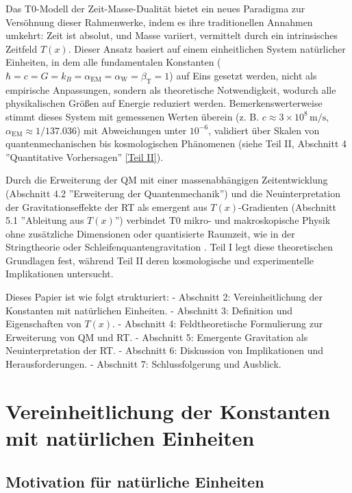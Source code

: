 \documentclass[12pt,a4paper]{article}
\newcommand{\Tfield}{T(x)}
\newcommand{\alphaEM}{\alpha_{\text{EM}}}
\newcommand{\alphaW}{\alpha_{\text{W}}}
\newcommand{\betaT}{\beta_{\text{T}}}
\begin{document}
	Das T0-Modell der Zeit-Masse-Dualität bietet ein neues Paradigma zur Versöhnung dieser Rahmenwerke, indem es ihre traditionellen Annahmen umkehrt: Zeit ist absolut, und Masse variiert, vermittelt durch ein intrinsisches Zeitfeld \(\Tfield\). Dieser Ansatz basiert auf einem einheitlichen System natürlicher Einheiten, in dem alle fundamentalen Konstanten (\(\hbar = c = G = k_B = \alphaEM = \alphaW = \betaT = 1\)) auf Eins gesetzt werden, nicht als empirische Anpassungen, sondern als theoretische Notwendigkeit, wodurch alle physikalischen Größen auf Energie reduziert werden. Bemerkenswerterweise stimmt dieses System mit gemessenen Werten überein (z. B. \(c \approx 3 \times 10^8 \, \text{m/s}\), \(\alphaEM \approx 1/137.036\)) mit Abweichungen unter \(10^{-6}\), validiert über Skalen von quantenmechanischen bis kosmologischen Phänomenen (siehe Teil II, Abschnitt 4 ''Quantitative Vorhersagen'' \href{https://github.com/jpascher/T0-Time-Mass-Duality/tree/main/2/pdf/Deutsch/QMRelTimeMassPart2.pdf}{[Teil II]}).
	
	Durch die Erweiterung der QM mit einer massenabhängigen Zeitentwicklung (Abschnitt 4.2 ''Erweiterung der Quantenmechanik'') und die Neuinterpretation der Gravitationseffekte der RT als emergent aus \(\Tfield\)-Gradienten (Abschnitt 5.1 ''Ableitung aus \(\Tfield\)'') verbindet T0 mikro- und makroskopische Physik ohne zusätzliche Dimensionen oder quantisierte Raumzeit, wie in der Stringtheorie oder Schleifenquantengravitation \cite{Greene2020,tHooft1993}. Teil I legt diese theoretischen Grundlagen fest, während Teil II deren kosmologische und experimentelle Implikationen untersucht.
	
	Dieses Papier ist wie folgt strukturiert:
	- Abschnitt 2: Vereinheitlichung der Konstanten mit natürlichen Einheiten.
	- Abschnitt 3: Definition und Eigenschaften von \(\Tfield\).
	- Abschnitt 4: Feldtheoretische Formulierung zur Erweiterung von QM und RT.
	- Abschnitt 5: Emergente Gravitation als Neuinterpretation der RT.
	- Abschnitt 6: Diskussion von Implikationen und Herausforderungen.
	- Abschnitt 7: Schlussfolgerung und Ausblick.
	
	\section{Vereinheitlichung der Konstanten mit natürlichen Einheiten}
	\label{sec:unified_units}
	
	\subsection{Motivation für natürliche Einheiten}
	\label{subsec:motivation_units}
	
\end{document}
